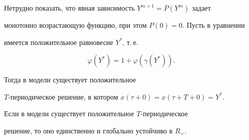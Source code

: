 Нетрудно показать, что явная зависимость $Y^{m+1}=P(Y^m)$ задает 


монотонно возрастающую функцию, при этом $P(0)=0$. Пусть в уравнении 


 имеется положительное равновесие $Y^*$, т.\,е.


$$


\varphi(Y^*)=1+\varphi(\gamma(Y^*)).


$$


Тогда в модели  существует положительное 


$T$-периодическое решение, в котором $x(\tau+0)=x(\tau+T+0)=Y^*$. 





\begin{thm}%


Если в модели  существует положительное $T$-периодическое 


решение, то оно единственно и глобально устойчиво в $R_+$.


\end{thm}%






